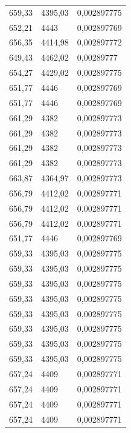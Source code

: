 \begin{center}
\begin{longtable}{|l|l|l|}
659,33            & 4395,03           & 0,002897775 \\
652,21            & 4443              & 0,002897769 \\
656,35            & 4414,98           & 0,002897772 \\
649,43            & 4462,02           & 0,00289777  \\
654,27            & 4429,02           & 0,002897775 \\
651,77            & 4446              & 0,002897769 \\
651,77            & 4446              & 0,002897769 \\
661,29            & 4382              & 0,002897773 \\
661,29            & 4382              & 0,002897773 \\
661,29            & 4382              & 0,002897773 \\
661,29            & 4382              & 0,002897773 \\
663,87            & 4364,97           & 0,002897773 \\
656,79            & 4412,02           & 0,002897771 \\
656,79            & 4412,02           & 0,002897771 \\
656,79            & 4412,02           & 0,002897771 \\
651,77            & 4446              & 0,002897769 \\
659,33            & 4395,03           & 0,002897775 \\
659,33            & 4395,03           & 0,002897775 \\
659,33            & 4395,03           & 0,002897775 \\
659,33            & 4395,03           & 0,002897775 \\
659,33            & 4395,03           & 0,002897775 \\
659,33            & 4395,03           & 0,002897775 \\
659,33            & 4395,03           & 0,002897775 \\
659,33            & 4395,03           & 0,002897775 \\
657,24            & 4409              & 0,002897771 \\
657,24            & 4409              & 0,002897771 \\
657,24            & 4409              & 0,002897771 \\
657,24            & 4409              & 0,002897771 \\

\end{longtable}
\end{center}
